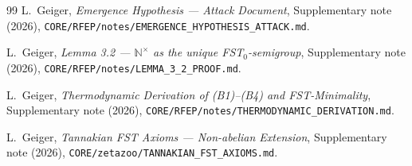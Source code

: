 \documentclass[11pt,a4paper]{article}
\theoremstyle{plain}
\theoremstyle{definition}
\newcommand{\N}{\mathbb{N}}
\begin{document}
\begin{thebibliography}{99}
L.~Geiger,
\textit{Emergence Hypothesis --- Attack Document},
Supplementary note (2026),
\texttt{CORE/RFEP/notes/EMERGENCE\_HYPOTHESIS\_ATTACK.md}.

L.~Geiger,
\textit{Lemma 3.2 --- $\N^\times$ as the unique FST$_0$-semigroup},
Supplementary note (2026),
\texttt{CORE/RFEP/notes/LEMMA\_3\_2\_PROOF.md}.

L.~Geiger,
\textit{Thermodynamic Derivation of (B1)--(B4) and FST-Minimality},
Supplementary note (2026),
\texttt{CORE/RFEP/notes/THERMODYNAMIC\_DERIVATION.md}.

L.~Geiger,
\textit{Tannakian FST Axioms --- Non-abelian Extension},
Supplementary note (2026),
\texttt{CORE/zetazoo/TANNAKIAN\_FST\_AXIOMS.md}.

\end{thebibliography}
\end{document}
